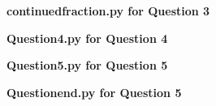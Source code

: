 \documentclass[12pt, a4paper]{article}
\begin{document}
\pagebreak
\textbf{continued\textunderscore fraction.py for Question 3}\centering\label{continued_fraction}

\vspace{2cm}

\pagebreak
\textbf{Question\textunderscore 4.py for Question 4}\centering\label{Question_4}

\vspace{2cm}

\pagebreak
\textbf{Question\textunderscore 5.py for Question 5}\centering\label{Question_5}

\vspace{2cm}

\pagebreak
\textbf{Question\textunderscore end.py for Question 5}\centering\label{Question_5_end}

\vspace{2cm}
\end{document}
